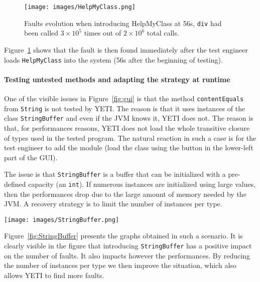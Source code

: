 \begin{figure}[h!]
\begin{center}
\texttt{[image: images/HelpMyClass.png]}
\end{center}
\caption{Faults evolution when introducing HelpMyClass at 56s, \texttt{div} had been called $3\times10^{5}$ times out of $2\times10^{6}$ total calls.}\label{fig:helpmyclass}
\end{figure}

Figure~\ref{fig:helpmyclass} shows that the fault is then found immediately after the test engineer loads \texttt{HelpMyClass} into the system (56s after the beginning of testing).

\paragraph{Testing untested methods and adapting the strategy at runtime}

One of the visible issues in Figure~\ref{fig:gui} is that the method \texttt{contentEquals} from \texttt{String} is not tested by YETI. The reason is that it uses instances of the class \texttt{StringBuffer} and even if the JVM knows it, YETI does not. The reason is that, for performances reasons, YETI does not load the whole transitive closure of types used in the tested program. The natural reaction in such a case is for the test engineer to add the module (load the class using the button in the lower-left part of the GUI). 

The issue is that \texttt{StringBuffer} is a buffer that can be initialized with a pre-defined capacity (an \texttt{int}). If numerous instances are initialized using large values, then the performances drop due to the large amount of memory needed by the JVM. A recovery strategy is to limit the number of instances per type.

\begin{figure*}[ht!]
\begin{center}
\texttt{[image: images/StringBuffer.png]}
\end{center}
\caption{Testing \texttt{String}, adding \texttt{StringBuffer}, and then reducing the number of instances per type (in this case 2).}\label{fig:StringBuffer}
\end{figure*}

Figure~\ref{fig:StringBuffer} presents the graphs obtained in such a scenario. It is clearly visible in the figure that introducing \texttt{StringBuffer} has a positive impact on the number of faults. It also impacts however the performances. By reducing the number of instances per type we then improve the situation, which also allows YETI to find more faults.
